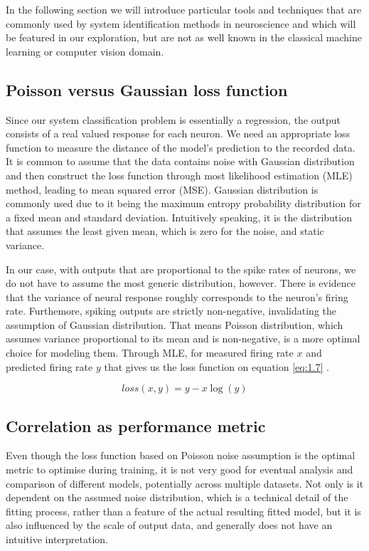 In the following section we will introduce particular tools and techniques that are commonly used by system identification methods in neuroscience and which will be featured in our exploration, but are not as well known in the classical machine learning or computer vision domain. 

\subsection{Poisson versus Gaussian loss function}\label{ch:1.4.1}

Since our system classification problem is essentially a regression, the output consists of a real valued response for each neuron. We need an appropriate loss function to measure the distance of the model’s prediction to the recorded data. It is common to assume that the data contains noise with Gaussian distribution and then construct the loss function through most likelihood estimation (MLE) method, leading to mean squared error (MSE). Gaussian distribution is commonly used due to it being the maximum entropy probability distribution for a fixed mean and standard deviation. Intuitively speaking, it is the distribution that assumes the least given mean, which is zero for the noise, and static variance.

In our case, with outputs that are proportional to the spike rates of neurons, we do not have to assume the most generic distribution, however. There is evidence \citep{Goris2014} that the variance of neural response roughly corresponds to the neuron’s firing rate. Furthemore, spiking outputs are strictly non-negative, invalidating the assumption of Gaussian distribution. That means Poisson distribution, which assumes variance proportional to its mean and is non-negative, is a more optimal choice for modeling them. Through MLE, for measured firing rate $x$ and predicted firing rate $y$ that gives us the loss function on equation \ref{eq:1.7} .

\begin{equation}\label{eq:1.7}
    loss(x,y)=y-x\log{(y)}
\end{equation}

\subsection{Correlation as performance metric}\label{ch:1.4.2}

Even though the loss function based on Poisson noise assumption is the optimal metric to optimise during training, it is not very good for eventual analysis and comparison of different models, potentially across multiple datasets. Not only is it dependent on the assumed noise distribution, which is a technical detail of the fitting process, rather than a feature of the actual resulting fitted model, but it is also influenced by the scale of output data, and generally does not have an intuitive interpretation.

